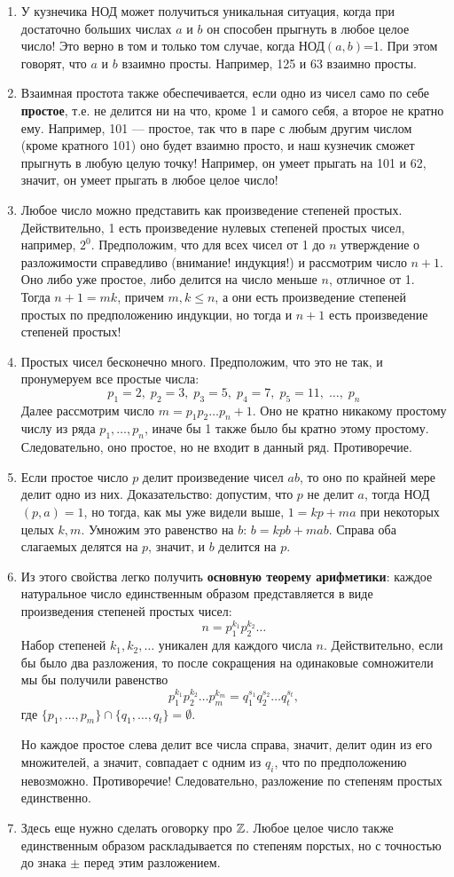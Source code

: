 \begin{enumerate}
\item У кузнечика НОД может получиться уникальная ситуация, когда при достаточно больших числах $a$ и $b$ он способен прыгнуть в любое целое число! Это верно в том и только том случае, когда НОД$(a,b)$=1. При этом говорят, что $a$ и $b$ взаимно просты. Например, 125 и 63 взаимно просты.
\item Взаимная простота также обеспечивается, если одно из чисел само по себе \textbf{простое}, т.е. не делится ни на что, кроме 1 и самого себя, а второе не кратно ему. Например, 101 --- простое, так что в паре с любым другим числом (кроме кратного 101) оно будет взаимно просто, и наш кузнечик сможет прыгнуть в любую целую точку! Например, он умеет прыгать на 101 и 62, значит, он умеет прыгать в любое целое число!
\item Любое число можно представить как произведение степеней простых. Действительно, 1 есть произведение нулевых степеней простых чисел, например, $2^0$. Предположим, что для всех чисел от 1 до $n$ утверждение о разложимости справедливо (внимание! индукция!) и рассмотрим число $n+1$. Оно либо уже простое, либо делится на число меньше $n$, отличное от 1. Тогда $n+1=mk$, причем $m,k\le n$, а они есть произведение степеней простых по предположению индукции, но тогда и $n+1$ есть произведение степеней простых!
\item Простых чисел бесконечно много. Предположим, что это не так, и пронумеруем все простые числа:
$$
p_1=2,\;p_2=3,\;p_3=5,\;p_4=7,\;p_5=11,\;\dots,\;p_n
$$
Далее рассмотрим число $m=p_1p_2\dots p_n+1$. Оно не кратно никакому простому числу из ряда $p_1,\dots,p_n$, иначе бы 1 также было бы кратно этому простому. Следовательно, оно простое, но не входит в данный ряд. Противоречие.
\item Если простое число $p$ делит произведение чисел $ab$, то оно по крайней мере делит одно из них. Доказательство: допустим, что $p$ не делит $a$, тогда НОД$(p,a)=1$, но тогда, как мы уже видели выше, $1=kp+ma$ при некоторых целых $k,m$. Умножим это равенство на $b$: $b=kpb+mab$. Справа оба слагаемых делятся на $p$, значит, и $b$ делится на $p$.
\item Из этого свойства легко получить \textbf{основную теорему арифметики}: каждое натуральное число единственным образом представляется в виде произведения степеней простых чисел:
$$
n=p_1^{k_1}p_2^{k_2}\dots
$$
Набор степеней $k_1,k_2,\dots$ уникален для каждого числа $n$. Действительно, если бы было два разложения, то после сокращения на одинаковые сомножители мы бы получили равенство
$$
p_1^{k_1}p_2^{k_2}\dots p_m^{k_m} = q_1^{s_1}q_2^{s_2}\dots q_t^{s_t},
$$
где $\{p_1,\dots,p_m\}\cap\{q_1,\dots,q_t\}=\emptyset$.

Но каждое простое слева делит все числа справа, значит, делит один из его множителей, а значит, совпадает с одним из $q_i$, что по предположению невозможно. Противоречие! Следовательно, разложение по степеням простых единственно.
\item Здесь еще нужно сделать оговорку про $\mathbb Z$. Любое целое число также единственным образом раскладывается по степеням порстых, но с точностью до знака $\pm$ перед этим разложением.
\end{enumerate}


